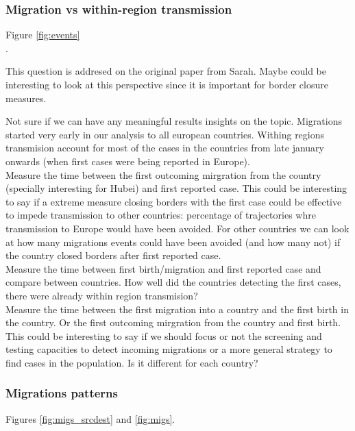 \documentclass[12pt,]{article}
\begin{document}
\subsubsection*{Migration vs within-region transmission}

Figure \ref{fig:events}\\.

This question is addresed on the original paper from Sarah.  Maybe could be interesting to look at this perspective since it is important for border closure measures.

 Not sure if we can have any meaningful results insights on the topic. Migrations started very early in our analysis to all european countries. Withing regions transmision account for most of the cases in the countries from late january onwards (when first cases were being reported in Europe).\\

 Measure the time between the first outcoming mirgration from the country  (specially interesting for Hubei) and first reported case. This could be interesting to say if a extreme measure closing borders with the first case could be effective to impede transmission to other countries: percentage of trajectories whre transmission to Europe would have been avoided. For other countries we can look at how many migrations events could have been avoided (and how many not) if the country closed borders after first reported case.\\ 

 Measure the time between first birth/migration and first reported case and compare between countries. How well did the countries detecting the first cases, there were already within region transmision?\\

 Measure the time between the first migration into a country and the first birth in the country. Or the first outcoming mirgration from the country and first birth. This could be interesting to say if we should focus or not the screening and testing capacities to detect incoming migrations or a more general strategy to find cases in the population. Is it different for each country?\\


\subsubsection*{Migrations patterns}
Figures \ref{fig:migs_srcdest} and \ref{fig:migs}.\\
\end{document}
